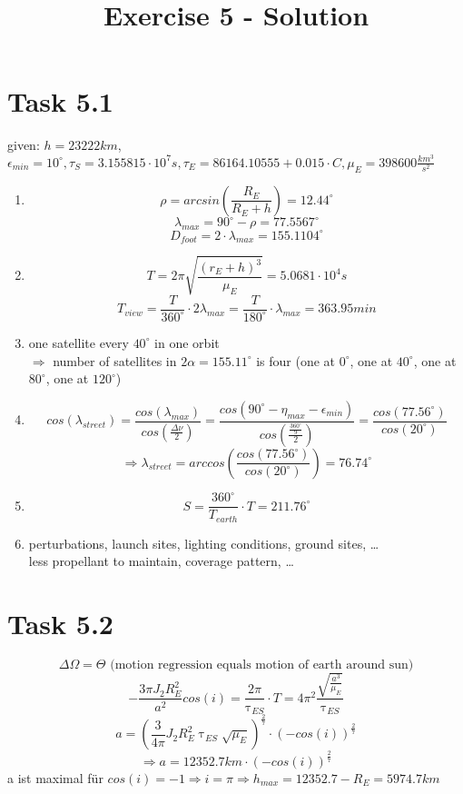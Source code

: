 \documentclass[a4paper,12pt]{article}
\title{Exercise 5 - Solution}
\author{}
\date{}
\begin{document}
\maketitle

\section*{Task 5.1}
given: $h = 23222 km$, $\epsilon_{min} = 10^{\circ}, \tau_S = 3.155815\cdot 10^7 s, \tau_E = 86164.10555 + 0.015\cdot C, \mu_E = 398600 \frac{km^3}{s^2}$ 
  
 \begin{enumerate}
  \item \[\rho = arcsin(\frac{R_E}{R_E+h}) = 12.44^{\circ}\]
   \[\lambda_{max} = 90^{\circ} - \rho = 77.5567^{\circ}\]
   \[D_{foot} = 2\cdot \lambda_{max} = 155.1104^{\circ}\]
  \item \[T=2\pi\sqrt{\frac{(r_E+h)^3}{\mu_E}} = 5.0681\cdot 10^4s\]
  \[T_{view} = \frac{T}{360^{\circ}}\cdot 2\lambda_{max} = \frac{T}{180^{\circ}}\cdot \lambda_{max} = 363.95min\]
  \item one satellite every $40^{\circ}$ in one orbit\\
  $\Rightarrow$ number of satellites in $2\alpha = 155.11^{\circ}$ is four (one at $0^{\circ}$, one at $40^{\circ}$, one at $80^{\circ}$, one at $120^{\circ}$)
  \item \[cos(\lambda_{street}) = \frac{cos(\lambda_{max})}{cos(\frac{\Delta \nu}{2})} = \frac{cos(90^{\circ}-\eta_{max}-\epsilon_{min})}{cos(\frac{\frac{360^{\circ}}{9}}{2})}
  = \frac{cos(77.56^{\circ})}{cos(20^{\circ})}\] \[ \Rightarrow \lambda_{street} = arccos(\frac{cos(77.56^{\circ})}{cos(20^{\circ})}) = 76.74^{\circ}\]
  \item \[S = \frac{360^{\circ}}{T_{earth}}\cdot T = 211.76^{\circ}\]
  \item perturbations, launch sites, lighting conditions, ground sites, \dots \\ less propellant to maintain, coverage pattern, \dots
 \end{enumerate}


\section*{Task 5.2}
\[\Delta \Omega = \Theta \text{ (motion regression equals motion of earth around sun)}\]
\[-\frac{3\pi J_2R_E^2}{a^2}cos(i) = \frac{2\pi}{\uptau_{ES}}\cdot T = 4\pi^2 \frac{\sqrt{\frac{a^3}{\mu_E}}}{\uptau_{ES}}\]
\[a = \left(\frac{3}{4\pi}J_2R_E^2\uptau_{ES}\sqrt{\mu_E} \right)^{\frac{2}{7}}\cdot (-cos(i))^\frac{2}{7}\]
\[\Rightarrow a = 12352.7km\cdot (-cos(i))^\frac{2}{7}\]
a ist maximal für $cos(i) = -1 \Rightarrow i = \pi \Rightarrow h_{max} = 12352.7- R_E = 5974.7km$ 
\end{document}
